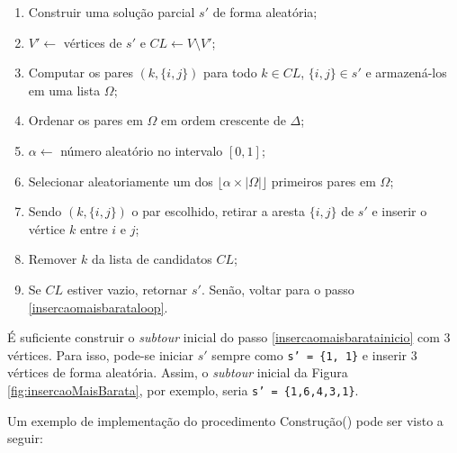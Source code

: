 \begin{enumerate}
    \item Construir uma solução parcial \(s'\) de forma aleatória; \label{insercaomaisbaratainicio}
    \item \(V' \leftarrow \) vértices de \(s'\) e \(CL \leftarrow V \setminus V'\); 
    \item Computar os pares \((k, \{i,j\})\) para todo \(k \in CL\), \(\{i,j\} \in s'\) e armazená-los em uma lista \(\Omega\); \label{insercaomaisbarataloop}
    \item Ordenar os pares em \(\Omega\) em ordem crescente de \(\Delta\);
    \item \(\alpha \leftarrow\) número aleatório no intervalo \([0,1]\);
    \item Selecionar aleatoriamente um dos \(\lfloor \alpha \times |\Omega| \rfloor \) primeiros pares em \(\Omega\);
    \item Sendo \((k, \{i,j\})\) o par escolhido, retirar a aresta \(\{i,j\}\) de \(s'\) e inserir o vértice \(k\) entre $i$ e $j$;
    \item Remover \(k\) da lista de candidatos \(CL\);
    \item Se \(CL\) estiver vazio, retornar \(s'\). Senão, voltar para o passo \ref{insercaomaisbarataloop}.
\end{enumerate}

É suficiente construir o \textit{subtour} inicial do passo \ref{insercaomaisbaratainicio} com 3 vértices. Para isso, pode-se iniciar \(s'\) sempre como \texttt{s' = \{1, 1\}} e inserir 3 vértices de forma aleatória. Assim, o \textit{subtour} inicial da  Figura \ref{fig:insercaoMaisBarata}, por exemplo, seria \texttt{s' = \{1,6,4,3,1\}}.

Um exemplo de implementação do procedimento Construção() pode ser visto a seguir:

